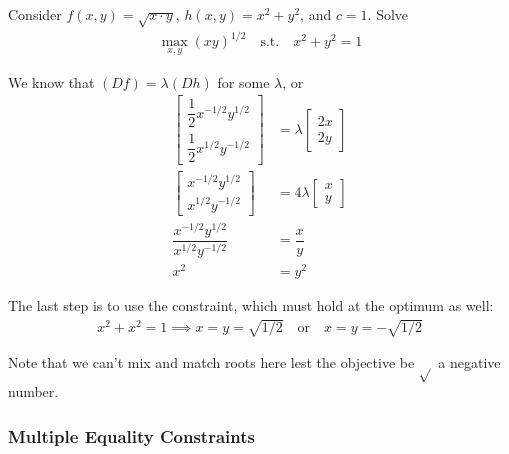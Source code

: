 \documentclass{article}
\begin{document}
\begin{example}
  Consider $f(x, y) = \sqrt{x \cdot y}$, $h(x, y) = x^2 + y^2$, and $c = 1$. Solve
  \begin{align*}
    \max_{x, y} (xy)^{1/2}
    \quad\text{s.t.}\quad x^2 + y^2 = 1
  \end{align*}

  We know that $(Df) = \lambda (Dh)$ for some  $\lambda$, or
  \begin{align*}
    \begin{bmatrix}
      \dfrac{1}{2} x^{-1/2} y^{1/2}
      \\
      \dfrac{1}{2} x^{1/2} y^{-1/2}
    \end{bmatrix}
    &
    =
    \lambda
    \begin{bmatrix}
      2x
      \\
      2y
    \end{bmatrix}
    \\
    \begin{bmatrix}
      x^{-1/2} y^{1/2}
      \\
      x^{1/2} y^{-1/2}
    \end{bmatrix}
    &
    =
    4
    \lambda
    \begin{bmatrix}
      x
      \\
      y
    \end{bmatrix}
    \\
    \dfrac{x^{-1/2} y^{1/2}}{x^{1/2} y^{-1/2}}
    &
    =
    \dfrac{x}{y}
    \\
    x^2
    &
    =
    y^2
  \end{align*}

  The last step is to use the constraint, which must hold at the optimum as well:
  \begin{align*}
    x^2 + x^2 = 1
    \implies
    x = y = \sqrt{1/2}
    \quad\text{or}\quad
    x = y = - \sqrt{1/2}
  \end{align*}

  Note that we can't mix and match roots here lest the objective be $\sqrt{}$ a negative number.
\end{example}

\subsubsection{Multiple Equality Constraints}
\label{ssub:multiple_equality_constraints}
\end{document}
